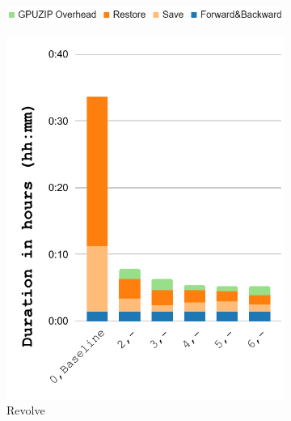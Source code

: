 \documentclass[Ingles,Final]{ic-tese-v3}
\begin{document}
\begin{figure}[]
    \centering
    \begin{subfigure}{0.8\textwidth}
        \includegraphics[width=\textwidth,trim={0 0 0 0},clip]{figures/prefetch_breakdown/prefetch_breakdown_legend.png}
        \label{fig:prefetch_breakdown_legend}
    \end{subfigure}
    \begin{subfigure}{0.3\textwidth}
        \includegraphics[width=\textwidth,trim={0 0 0 0},clip]{figures/prefetch_breakdown/prefetch_breakdown_revolve_salt.pdf}
        \caption{Revolve}
        \label{fig:prefetch_breakdown_revolve}
    \end{subfigure}%
    \begin{subfigure}{0.3\textwidth}

\end{subfigure}
\end{figure}
\end{document}

